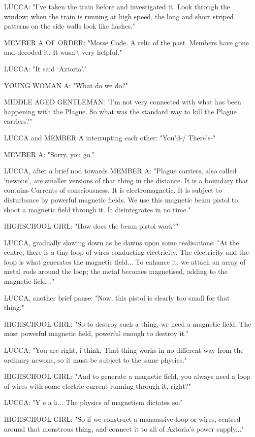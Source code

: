 \documentclass[11pt]{article}
\begin{document}
LUCCA: "I've taken the train before and investigated it.
Look through the window; when the train is running at high speed, the long and short striped patterns on the side walls look like flashes."

MEMBER A OF ORDER: "Morse Code. 
A relic of the past.
Members have gone and decoded it. 
It wasn't very helpful."

LUCCA: "It said `Aztoria'."

YOUNG WOMAN A: "What do we do?"

MIDDLE AGED GENTLEMAN: "I'm not very connected with what has been happening with the Plague. 
So what was the standard way to kill the Plague carriers?"

LUCCA and MEMBER A interrupting each other: "You'd-/ There's-"

MEMBER A: "Sorry, you go."

LUCCA, after a brief nod towards MEMBER A: "Plague carriers, also called `newons', are smaller versions of that thing in the distance. 
It is a boundary that contains Currents of consciousness. 
It is electromagnetic.
It is subject to disturbance by powerful magnetic fields.
We use this magnetic beam pistol to shoot a magnetic field through it.
It disintegrates in no time."

HIGHSCHOOL GIRL: "How does the beam pistol work?"

LUCCA, gradually slowing down as he dawns upon some realisations: "At the centre, there is a tiny loop of wires conducting electricity. 
The electricity and the loop is what generates the magnetic field...
To enhance it, we attach an array of metal rods around the loop; the metal becomes magnetised, adding to the magnetic field..."

LUCCA, another brief pause: "Now, this pistol is clearly too small for that thing."

HIGHSCHOOL GIRL: "So to destroy such a thing, we need a magnetic field.
The most powerful magnetic field, powerful enough to destroy it."

LUCCA: "You are right, i think. That thing works in no different way from the ordinary newons, so it must be subject to the same physics."

HIGHSCHOOL GIRL: "And to generate a magnetic field, you always need a loop of wires with some electric current running through it, right?"

LUCCA: "Y e a h... The physics of magnetism dictates so."

HIGHSCHOOL GIRL: "So if we construct a maaaassive loop or wires, centred around that monstrous thing, and connect it to all of Aztoria's power supply..."
\end{document}
